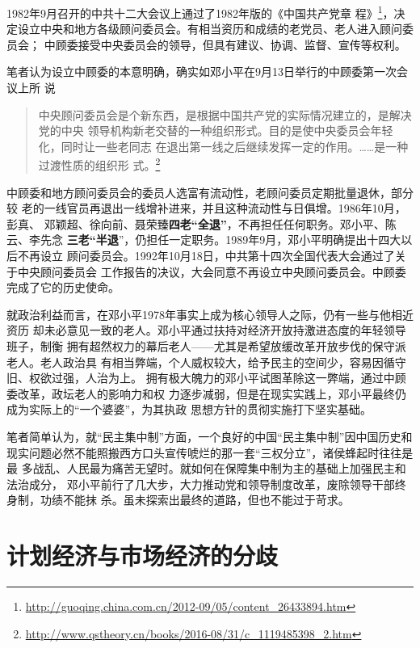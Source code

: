 1982年9月召开的中共十二大会议上通过了1982年版的《中国共产党章
程》\footnote{\url{http://guoqing.china.com.cn/2012-09/05/content_26433894.htm}}，决
定设立中央和地方各级顾问委员会。有相当资历和成绩的老党员、老人进入顾问委员会；
中顾委接受中央委员会的领导，但具有建议、协调、监督、宣传等权利。

笔者认为设立中顾委的本意明确，确实如邓小平在9月13日举行的中顾委第一次会议上所
说
\begin{quotation}
  中央顾问委员会是个新东西，是根据中国共产党的实际情况建立的，是解决党的中央
  领导机构新老交替的一种组织形式。目的是使中央委员会年轻化，同时让一些老同志
  在退出第一线之后继续发挥一定的作用。……是一种过渡性质的组织形
  式。\footnote{\url{http://www.qstheory.cn/books/2016-08/31/c_1119485398_2.htm}}
\end{quotation}

中顾委和地方顾问委员会的委员人选富有流动性，老顾问委员定期批量退休，部分较
老的一线官员再退出一线增补进来，并且这种流动性与日俱增。1986年10月，彭真、
邓颖超、徐向前、聂荣臻\textbf{四老“全退”}，不再担任任何职务。邓小平、陈云、李先念
\textbf{三老“半退}”，仍担任一定职务。1989年9月，邓小平明确提出十四大以后不再设立
顾问委员会。1992年10月18日，中共第十四次全国代表大会通过了关于中央顾问委员会
工作报告的决议，大会同意不再设立中央顾问委员会。中顾委完成了它的历史使命。

就政治利益而言，在邓小平1978年事实上成为核心领导人之际，仍有一些与他相近资历
却未必意见一致的老人。邓小平通过扶持对经济开放持激进态度的年轻领导班子，制衡
拥有超然权力的幕后老人——尤其是希望放缓改革开放步伐的保守派老人。老人政治具
有相当弊端，个人威权较大，给予民主的空间少，容易因循守旧、权欲过强，人治为上。
拥有极大魄力的邓小平试图革除这一弊端，通过中顾委改革，政坛老人的影响力和权
力逐步减弱，但是在现实实践上，邓小平最终仍成为实际上的“一个婆婆”，为其执政
思想方针的贯彻实施打下坚实基础。


笔者简单认为，就“民主集中制”方面，一个良好的中国“民主集中制”因中国历史和
现实问题必然不能照搬西方口头宣传唬烂的那一套“三权分立”，诸侯蜂起时往往是最
多战乱、人民最为痛苦无望时。就如何在保障集中制为主的基础上加强民主和法治成分，
邓小平前行了几大步，大力推动党和领导制度改革，废除领导干部终身制，功绩不能抹
杀。虽未探索出最终的道路，但也不能过于苛求。

\section{计划经济与市场经济的分歧}


